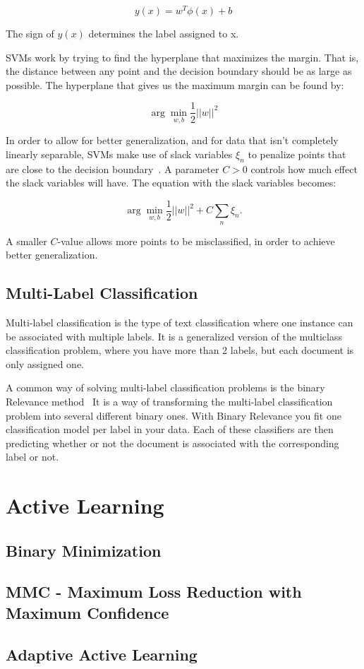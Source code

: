 \begin{equation}
    y(x) = w^T \phi(x) + b
\end{equation}

The sign of $y(x)$ determines the label assigned to x.

SVMs work by trying to find the hyperplane that maximizes the margin.
That is, the distance between any point and the decision boundary should be as large as possible.
The hyperplane that gives us the maximum margin can be found by:

\begin{equation}
    \arg\min_{w,b}\frac{1}{2}||w||^2
\end{equation}

In order to allow for better generalization, and for data that isn't completely linearly separable, SVMs make use of slack variables $\xi_n$ to penalize points that are close to the decision boundary~\cite{bishop2006pattern}.
A parameter $C>0$ controls how much effect the slack variables will have.
The equation with the slack variables becomes:

\begin{equation}
    \arg\min_{w,b}\frac{1}{2}||w||^2 + C \sum_n\xi_n.
\end{equation}

A smaller $C$-value allows more points to be misclassified, in order to achieve better generalization.

\subsection{Multi-Label Classification}

Multi-label classification is the type of text classification where one instance can be associated with multiple labels.
It is a generalized version of the multiclass classification problem, where you have more than 2 labels, but each document is only assigned one.

A common way of solving multi-label classification problems is the binary Relevance method~\cite{read2011classifier}
It is a way of transforming the multi-label classification problem into several different binary ones.
With Binary Relevance you fit one classification model per label in your data.
Each of these classifiers are then predicting whether or not the document is associated with the corresponding label or not.

\section{Active Learning}

\subsection{Binary Minimization}

\subsection{MMC - Maximum Loss Reduction with Maximum Confidence}

\subsection{Adaptive Active Learning}